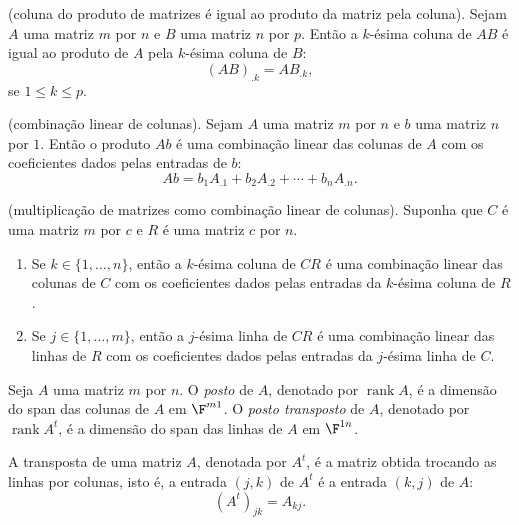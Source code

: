 \documentclass{article}
\DeclareMathOperator{\rank}{rank}
\begin{document}
\begin{prop} (coluna do produto de matrizes é igual ao produto da matriz pela coluna).
    Sejam \(A\) uma matriz \(m\) por \(n\) e \(B\) uma matriz \(n\) por \(p\). Então a \(k\)-ésima coluna de \(AB\) é igual ao produto de \(A\) pela \(k\)-ésima coluna de \(B\):
    \[
        (AB)_{.k} = A B_{.k},
    \]
    \noindent se \(1 \leq k \leq p\).
\end{prop}

\begin{cor} (combinação linear de colunas).
    Sejam \(A\) uma matriz \(m\) por \(n\) e \(b\) uma matriz \(n\) por \(1\). Então o produto \(Ab\) é uma combinação linear das colunas de \(A\) com os coeficientes dados pelas entradas de \(b\):
    \[
        Ab = b_1 A_{.1} + b_2 A_{.2} + \cdots + b_n A_{.n}.
    \]
\end{cor}

\begin{cor} (multiplicação de matrizes como combinação linear de colunas).
    Suponha que \(C\) é uma matriz \(m\) por \(c\) e \(R\) é uma matriz \(c\) por \(n\).
    \begin{enumerate}
        \item[(a)] Se \(k \in \{1, \ldots, n\}\), então a \(k\)-ésima coluna de \(CR\) é uma combinação linear das colunas de \(C\) com os coeficientes dados pelas entradas da \(k\)-ésima coluna de \(R\).
        \item[(b)] Se \(j \in \{1, \ldots, m\}\), então a \(j\)-ésima linha de \(CR\) é uma combinação linear das linhas de \(R\) com os coeficientes dados pelas entradas da \(j\)-ésima linha de \(C\).
    \end{enumerate}
\end{cor}

\begin{defn}
    Seja \(A\) uma matriz \(m\) por \(n\). O \emph{posto} de \(A\), denotado por \(\rank A\), é a dimensão do span das colunas de \(A\) em \(\F^{m1}\). O \emph{posto transposto} de \(A\), denotado por \(\rank A^t\), é a dimensão do span das linhas de \(A\) em \(\F^{1n}\).
\end{defn}

\begin{defn}
    A transposta de uma matriz \(A\), denotada por \(A^t\), é a matriz obtida trocando as linhas por colunas, isto é, a entrada \((j, k)\) de \(A^t\) é a entrada \((k, j)\) de \(A\):
    \[
        (A^t)_{jk} = A_{kj}.
    \]
\end{defn}
\end{document}
